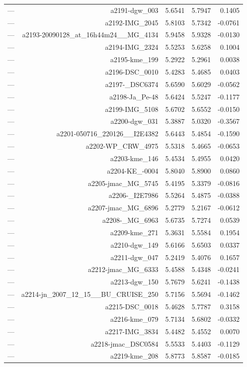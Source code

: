 \begin{table}[htbp]
\begin{tabular}{lrrrr}
— & a2191-dgw_003 & 5.6541 & 5.7947 & 0.1405 \\
— & a2192-IMG_2045 & 5.8103 & 5.7342 & -0.0761 \\
— & a2193-20090128_at_16h44m24__MG_4134 & 5.9458 & 5.9328 & -0.0130 \\
— & a2194-IMG_2324 & 5.5253 & 5.6258 & 0.1004 \\
— & a2195-kme_199 & 5.2922 & 5.2961 & 0.0038 \\
— & a2196-DSC_0010 & 5.4283 & 5.4685 & 0.0403 \\
— & a2197-_DSC6374 & 5.6590 & 5.6029 & -0.0562 \\
— & a2198-Ja_Pe-48 & 5.6424 & 5.5247 & -0.1177 \\
— & a2199-IMG_5108 & 5.6702 & 5.6552 & -0.0150 \\
— & a2200-dgw_031 & 5.3887 & 5.0320 & -0.3567 \\
— & a2201-050716_220126__I2E4382 & 5.6443 & 5.4854 & -0.1590 \\
— & a2202-WP_CRW_4975 & 5.5318 & 5.4665 & -0.0653 \\
— & a2203-kme_146 & 5.4534 & 5.4955 & 0.0420 \\
— & a2204-KE_-0004 & 5.8040 & 5.8900 & 0.0860 \\
— & a2205-jmac_MG_5745 & 5.4195 & 5.3379 & -0.0816 \\
— & a2206-_I2E7986 & 5.5264 & 5.4875 & -0.0388 \\
— & a2207-jmac_MG_6896 & 5.2779 & 5.2167 & -0.0612 \\
— & a2208-_MG_6963 & 5.6735 & 5.7274 & 0.0539 \\
— & a2209-kme_271 & 5.3631 & 5.5584 & 0.1954 \\
— & a2210-dgw_149 & 5.6166 & 5.6503 & 0.0337 \\
— & a2211-dgw_047 & 5.2419 & 5.4076 & 0.1657 \\
— & a2212-jmac_MG_6333 & 5.4588 & 5.4348 & -0.0241 \\
— & a2213-dgw_150 & 5.7679 & 5.6241 & -0.1438 \\
— & a2214-jn_2007_12_15__BU_CRUISE_250 & 5.7156 & 5.5694 & -0.1462 \\
— & a2215-DSC_0018 & 5.4628 & 5.7787 & 0.3158 \\
— & a2216-kme_079 & 5.7134 & 5.6802 & -0.0332 \\
— & a2217-IMG_3834 & 5.4482 & 5.4552 & 0.0070 \\
— & a2218-jmac_DSC0584 & 5.5533 & 5.4403 & -0.1129 \\
— & a2219-kme_208 & 5.8773 & 5.8587 & -0.0185 \\

\end{tabular}
\end{table}
